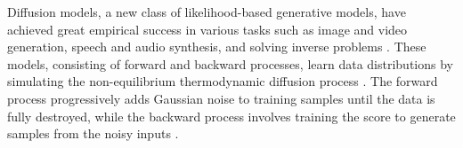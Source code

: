 

Diffusion models, a new class of likelihood-based generative models, have achieved great empirical success in various tasks such as image and video generation, speech and audio synthesis, and solving inverse problems \citep{alkhouri2024diffusion, ho2020denoising, rombach2022high, zhang2024improving, bar2024lumiere, ho2022imagen, kong2020hifi, kongdiffwave2021, roich2022pivotal, ruiz2023dreambooth, chen2024exploring, chung2022improving, song2024solving, li2024decoupled}. These models, consisting of forward and backward processes, learn data distributions by simulating the non-equilibrium thermodynamic diffusion process \citep{sohl2015deep, ho2020denoising, song2020score}. The forward process progressively adds Gaussian noise to training samples until the data is fully destroyed, while the backward process involves training the score to generate samples from the noisy inputs \citep{hyvarinen2005estimation, song2020score}.




